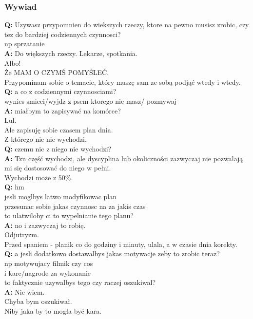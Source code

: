 \documentclass[11pt,wide]{mwart}
\newcommand{\w}[1]{
    \indent\textbf{#1}
 }
\begin{document}
\subsubsection{Wywiad}
\begin{multicols}{2}
\noindent \w{Q:}Uzywasz przypomnien do wiekszych rzeczy, ktore na pewno musisz zrobic, czy tez do bardziej codziennych czynnosci?\\
np sprzatanie\\
\w{A:}Do większych rzeczy. Lekarze, spotkania.\\
Albo!\\
Że MAM O CZYMŚ POMYŚLEĆ.\\
Przypominam sobie o temacie, który muszę sam ze sobą podjąć wtedy i wtedy.\\
\w{Q:}a co z codziennymi czynnosciami?\\
wynies smieci/wyjdz z psem ktorego nie masz/ pozmywaj\\
\w{A:}miałbym to zapisywać na komórce?\\
Lul.\\
Ale zapisuję sobie czasem plan dnia.\\
Z którego nic nie wychodzi.\\
\w{Q:}czemu nic z niego nie wychodzi?\\
\w{A:}Tzn część wychodzi, ale dyscyplina lub okoliczności zazwyczaj nie pozwalają mi się dostosować do niego w pełni.\\
Wychodzi może z 50\%.\\
\w{Q:}hm\\
jesli moglbys latwo modyfikowac plan\\
przesunac sobie jakas czynnosc na za jakis czas\\
to ulatwiloby ci to wypelnianie tego planu?\\
\w{A:}no i zazwyczaj to robię.\\
Odjutryzm.\\
Przed spaniem - planik co do godziny i minuty, ulala, a w czasie dnia korekty.\\
\w{Q:}a jesli dodatkowo dostawalbys jakas motywacje zeby to zrobic teraz?\\
np motywujacy filmik czy cos\\
i kare/nagrode za wykonanie\\
to faktycznie uzywalbys tego czy raczej oszukiwal?\\
\w{A:}Nie wiem.\\
Chyba bym oszukiwał.\\
Niby jaka by to mogła być kara.\\

\end{multicols}
\end{document}
